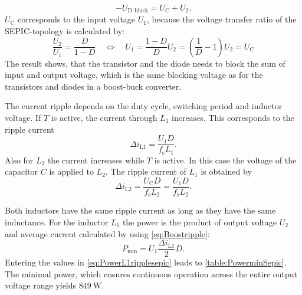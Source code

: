 \begin{solutionblock}
\begin{equation}
        -U_\mathrm{D,block}=U_\mathrm{C}+U_\mathrm{2}.
    \end{equation}
    $U_\mathrm{C}$ corresponds to the input voltage $U_\mathrm{1}$, because the voltage transfer ratio of the SEPIC-topology
    is calculated by:
    \begin{equation}
        \frac{U_\mathrm{2}}{U_\mathrm{1}}= \frac{D}{1-D} \quad \Leftrightarrow \quad 
        U_\mathrm{1}=\frac{1-D}{D}U_\mathrm{2}=\left( \frac{1}{D}-1\right)U_\mathrm{2}=U_\mathrm{C}
    \end{equation}
    The result shows, that the transistor and the diode needs to block the sum of input and output voltage, 
    which is the same blocking voltage as for the transistors and diodes in a boost-buck converter.
\end{solutionblock}


\begin{solutionblock}
    The current ripple depends on the duty cycle, switching period and inductor voltage. 
    If $T$ is active, the current through $L_1$ increases. This corresponds to the ripple current
    \begin{equation}
        \Delta i_\mathrm{L1}=\frac{U_\mathrm{1}D}{f_\mathrm{s}L_\mathrm{1}}.
    \end{equation}
    Also for $L_2$ the current increases while $T$ is active. In this case the voltage of the capacitor $C$ is applied to $L_2$.
    The ripple current of $L_1$ is obtained by
    \begin{equation}
        \Delta i_\mathrm{L2}=\frac{U_\mathrm{C}D}{f_\mathrm{s}L_\mathrm{2}}=\frac{U_\mathrm{1}D}{f_\mathrm{s}L_\mathrm{2}}.
    \end{equation}
\end{solutionblock}


\begin{solutionblock}
    Both inductors have the same ripple current as long as they have the same inductance.
    For the inductor $L_1$ the power is the product of output voltage
     $U_\mathrm{2}$ and average current calculated by using \eqref{eq:Boostripple}:
    \begin{equation}
        P_\mathrm{min}=U_\mathrm{1}\frac{\Delta i_\mathrm{L1}}{2}D.
        \label{eq:PowerL1ripplesepic}
    \end{equation}
    Entering the values in \eqref{eq:PowerL1ripplesepic} leads to \autoref{table:PowerminSepic}. The minimal power, which ensures continuous operation across the entire output voltage range yields $\SI{849}{\watt}$.

\end{solutionblock}

